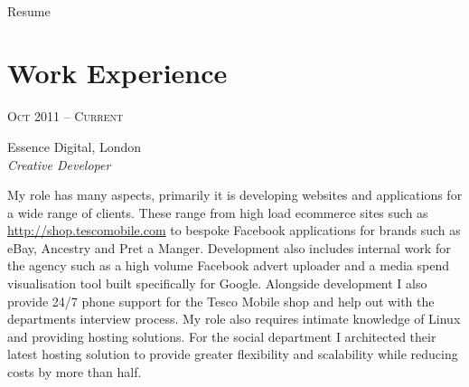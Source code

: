 \documentclass[10pt]{article} %
\begin{document}
\color{text1} %


\par{\\
{\color{headings} Resume\\[15pt]\par}
	

\begin{minipage}[t]{0.5\textwidth}
\vspace{0pt}


\section{Work Experience} 

{\raggedleft\textsc{Oct 2011 -- Current}\par}

{\raggedright\large Essence Digital, London\\
\textit{Creative Developer}\\[5pt]}

\normalsize{My role has many aspects, primarily it is developing websites and applications for a wide range of clients. 
These range from high load ecommerce sites such as \href{http://shop.tescomobile.com}{http://shop.tescomobile.com} to bespoke Facebook applications for brands such as eBay, Ancestry and Pret a Manger.
Development also includes internal work for the agency such as a high volume Facebook advert uploader and a media spend visualisation tool built specifically for Google.
Alongside development I also provide 24/7 phone support for the Tesco Mobile shop and help out with the departments interview process.
My role also requires intimate knowledge of Linux and providing hosting solutions. 
For the social department I architected their latest hosting solution to provide greater flexibility and scalability while reducing costs by more than half.
}\\


\end{minipage}}
\end{document}
